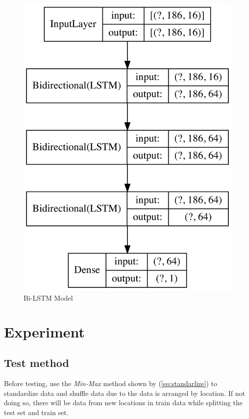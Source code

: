 \documentclass[conference]{IEEEtran}
\begin{document}
      \begin{figure}[htbp]
        \centerline{\includegraphics[width=\linewidth]{figures/Model_figure.png}}
        \caption{Bi-LSTM Model}
        \label{fig:model}
      \end{figure}


\section{Experiment} \label{sec:ex}
\subsection{Test method}
  Before testing, use the \textit{Min-Max} method shown by (\ref{eq:standarlize}) to standardize data and shuffle data due to the data is arranged by location. If not doing so, there will be data from new locations in train data while splitting the test set and train set.
\end{document}
